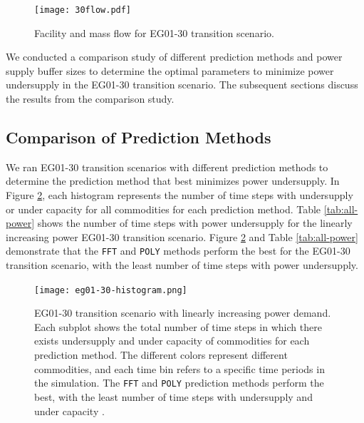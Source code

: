 \begin{figure}[]
    \centering
    \texttt{[image: 30flow.pdf]} 
    \caption{Facility and mass flow for EG01-30 transition scenario.}
    \label{fig:30flow}
\end{figure}

We conducted a comparison study of different prediction 
methods and power supply buffer sizes to determine the 
optimal \deploy parameters to minimize 
power undersupply in the EG01-30 \Cyclus 
transition scenario. 
The subsequent sections discuss the results from the comparison 
study. 

\subsection{Comparison of Prediction Methods}
We ran EG01-30 transition scenarios with different prediction 
methods to determine the prediction method that best minimizes 
power undersupply. 
In Figure \ref{fig:eg30under}, each histogram represents 
the number of time steps with undersupply or 
under capacity for all commodities for each prediction method.  
Table \ref{tab:all-power} shows the number of time steps with power 
undersupply for the linearly increasing power EG01-30 transition scenario. 
Figure \ref{fig:eg30under} and Table \ref{tab:all-power}
demonstrate that the \texttt{FFT} and \texttt{POLY} methods 
perform the best for the EG01-30 transition scenario, 
with the least number of time steps with power undersupply.

\begin{figure}[]
	\centering
	\texttt{[image: eg01-30-histogram.png]} 
	\caption{
	EG01-30 transition scenario with linearly increasing power demand. 
	Each subplot shows the total number of time steps in which there exists 
	undersupply and under capacity of commodities for each prediction method. 
	The different colors represent different commodities, and each time bin 
	refers to a specific time periods in the simulation.
    The \texttt{FFT} and \texttt{POLY} prediction methods perform the best, 
    with the least number of 
	time steps with undersupply and under capacity \cite{chee_arfc/transition-scenarios_2018}.}
	\label{fig:eg30under}
\end{figure}

